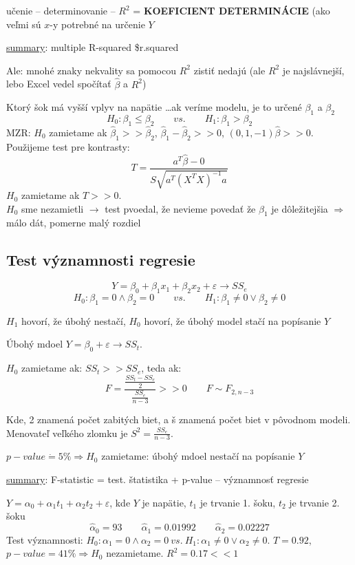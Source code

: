 \documentclass[unknownkeysallowed]{article}
\begin{document}
učenie -- determinovanie -- $R^2$ = \textbf{KOEFICIENT DETERMINÁCIE} (ako veľmi sú $x$-y potrebné na určenie $Y$

\underline{summary}: multiple R-squared \$r.squared
\vspace{5mm}

Ale: mnohé znaky nekvality sa pomocou $R^2$ zistiť nedajú (ale $R^2$ je najslávnejší, lebo Excel vedel spočítať $\hat{\beta}$ a $R^2$)
\vspace{5mm}

Ktorý šok má vyšší vplyv na napätie \ldots ak veríme modelu, je to určené $\beta_1$ a $\beta_2$
$$H_0: \beta_1 \leq \beta_2 \qquad vs. \qquad H_1: \beta_1 > \beta_2$$
MZR: $H_0$ zamietame ak $\hat{\beta}_1 >> \hat{\beta}_2$, $\hat{\beta}_1 - \hat{\beta}_2 >> 0$, $(0,1,-1)\hat{\beta} >> 0$. Použijeme test pre kontrasty:
$$T = \frac{a^T\hat{\beta}-0}{S\sqrt{a^T(X^TX)^{-1}a}}$$
$H_0$ zamietame ak $T >> 0$.\\
$H_0$ sme nezamietli $\to$ test pvoedal, že nevieme povedať že $\beta_1$ je dôležitejšia $\Rightarrow$ málo dát, pomerne malý rozdiel

\subsection*{Test významnosti regresie}
$$Y = \beta_0 + \beta_1x_1 + \beta_2x_2 + \varepsilon \to SS_e$$
$$H_0: \beta_1 = 0 \land \beta_2 = 0 \qquad vs. \qquad H_1: \beta_1 \neq 0 \lor \beta_2 \neq 0$$

$H_1$ hovorí, že úbohý nestačí, $H_0$ hovorí, že úbohý model stačí na popísanie $Y$

Úbohý mdoel $Y = \beta_0 + \varepsilon \to SS_t$.

$H_0$ zamietame ak: $SS_t >> SS_e$, teda ak:
$$F = \frac{\frac{SS_t-SS_e}{2}}{\frac{SS_e}{n-3}} >> 0 \qquad F \sim F_{2,n-3}$$

Kde, 2 znamená počet zabitých biet, a š znamená počet biet v pôvodnom modeli. Menovateľ veľkého zlomku je $S^2 = \frac{SS_e}{n-3}$.

$p-value \dot{=} 5\% \Rightarrow H_0$ zamietame: úbohý mdoel nestačí na popísanie $Y$

\underline{summary}: F-statistic = test. štatistika + p-value -- významnosť regresie
\vspace{5mm}

$Y = \alpha_0 + \alpha_1t_1 + \alpha_2t_2 + \varepsilon$, kde $Y$ je napätie, $t_1$ je trvanie 1. šoku, $t_2$ je trvanie 2. šoku
$$\hat{\alpha}_0 = 93 \qquad \hat{\alpha}_1 = 0.01992 \qquad \hat{\alpha}_2 = 0.02227$$
Test významnosti: $H_0: \alpha_1 = 0 \land \alpha_2 = 0 ~vs.~ H_1: \alpha_1 \neq 0 \lor \alpha_2 \neq 0$. $T = 0.92$, $p-value = 41\% \Rightarrow H_0$ nezamietame. $R^2 = 0.17 << 1$
\end{document}
